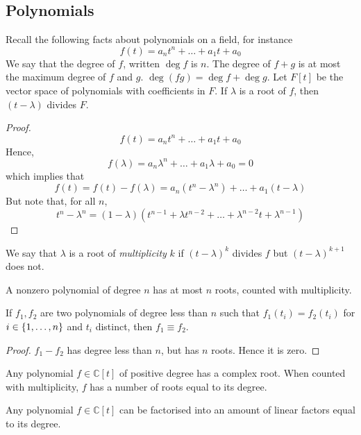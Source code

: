 \subsection{Polynomials}
Recall the following facts about polynomials on a field, for instance
\[
	f(t) = a_n t^n + \dots + a_1 t + a_0
\]
We say that the degree of \( f \), written \( \deg f \) is \( n \).
The degree of \( f + g \) is at most the maximum degree of \( f \) and \( g \).
\( \deg (fg) = \deg f + \deg g \).
Let \( F[t] \) be the vector space of polynomials with coefficients in \( F \).
If \( \lambda \) is a root of \( f \), then \( (t-\lambda) \) divides \( F \).
\begin{proof}
	\[
		f(t) = a_n t^n + \dots + a_1 t + a_0
	\]
	Hence,
	\[
		f(\lambda) = a_n \lambda^n + \dots + a_1 \lambda + a_0 = 0
	\]
	which implies that
	\[
		f(t) = f(t) - f(\lambda) = a_n(t^n - \lambda^n) + \dots + a_1(t - \lambda)
	\]
	But note that, for all \( n \),
	\[
		t^n - \lambda^n = (1-\lambda)(t^{n-1} + \lambda t^{n-2} + \dots + \lambda^{n-2} t + \lambda^{n-1})
	\]
\end{proof}
\begin{remark}
	We say that \( \lambda \) is a root of \textit{multiplicity} \( k \) if \( (t-\lambda)^k \) divides \( f \) but \( (t-\lambda)^{k+1} \) does not.
\end{remark}
\begin{corollary}
	A nonzero polynomial of degree \( n \) has at most \( n \) roots, counted with multiplicity.
\end{corollary}
\begin{corollary}
	If \( f_1, f_2 \) are two polynomials of degree less than \( n \) such that \( f_1(t_i) = f_2(t_i) \) for \( i \in \qty{1, \dots, n} \) and \( t_i \) distinct, then \( f_1 \equiv f_2 \).
\end{corollary}
\begin{proof}
	\( f_1 - f_2 \) has degree less than \( n \), but has \( n \) roots.
	Hence it is zero.
\end{proof}
\begin{theorem}
	Any polynomial \( f \in \mathbb C[t] \) of positive degree has a complex root.
	When counted with multiplicity, \( f \) has a number of roots equal to its degree.
\end{theorem}
\begin{corollary}
	Any polynomial \( f \in \mathbb C[t] \) can be factorised into an amount of linear factors equal to its degree.
\end{corollary}

